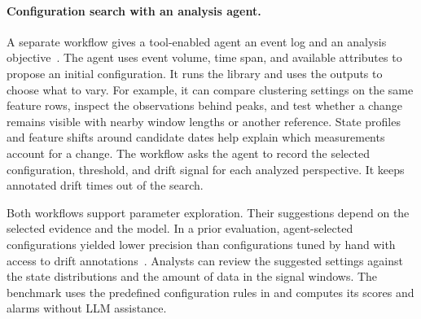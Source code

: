 \paragraph{Configuration search with an analysis agent.}
A separate workflow gives a tool-enabled agent an event log and an analysis objective~\cite{kairo-thesis}. The agent uses event volume, time span, and available attributes to propose an initial configuration. It runs the library and uses the outputs to choose what to vary. For example, it can compare clustering settings on the same feature rows, inspect the observations behind peaks, and test whether a change remains visible with nearby window lengths or another reference. State profiles and feature shifts around candidate dates help explain which measurements account for a change. The workflow asks the agent to record the selected configuration, threshold, and drift signal for each analyzed perspective. It keeps annotated drift times out of the search.

Both workflows support parameter exploration. Their suggestions depend on the selected evidence and the model. In a prior evaluation, agent-selected configurations yielded lower precision than configurations tuned by hand with access to drift annotations~\cite{kairo-thesis}. Analysts can review the suggested settings against the state distributions and the amount of data in the signal windows. The benchmark uses the predefined configuration rules in  and computes its scores and alarms without LLM assistance.
